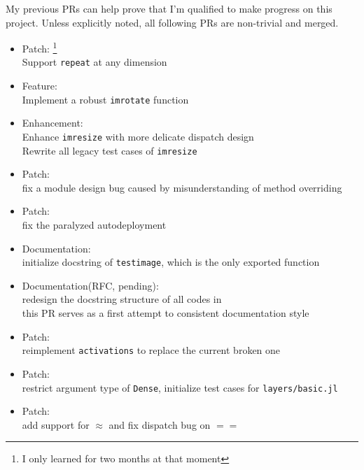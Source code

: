 My previous PRs can help prove that I'm qualified to make progress on this project. Unless explicitly noted, all following PRs are non-trivial and merged.
\begin{itemize}
    \item Patch: \footnote{I only learned \langjulia{} for two months at that moment} \\
      {\small
      Support \texttt{repeat} at any dimension
      }
    \item Feature:  \\
      {\small
      Implement a robust \texttt{imrotate} function
      }
    \item Enhancement:  \\
      {\small
      Enhance \texttt{imresize} with more delicate dispatch design\\
      Rewrite all legacy test cases of \texttt{imresize}
      }
    \item Patch:  \\
      {\small
      fix a module design bug caused by misunderstanding of method overriding
      }
    \item Patch:  \\
      {\small
      fix the paralyzed autodeployment
      }
    \item Documentation:  \\
      {\small
      initialize docstring of \texttt{testimage}, which is the only exported function
      }
    \item Documentation(RFC, pending): \\
      {\small
      redesign the docstring structure of all codes in \imagebinarization\\
      this PR serves as a first attempt to consistent documentation style
      }
    \item Patch:  \\
      {\small
      reimplement \texttt{activations} to replace the current broken one
      }
    \item Patch:  \\
      {\small
      restrict argument type of \texttt{Dense}, initialize test cases for \texttt{layers/basic.jl}
      }
    \item Patch:  \\
      {\small
      add support for \textsf{$\approx$} and fix dispatch bug on \textsf{$==$}
      }
\end{itemize}
